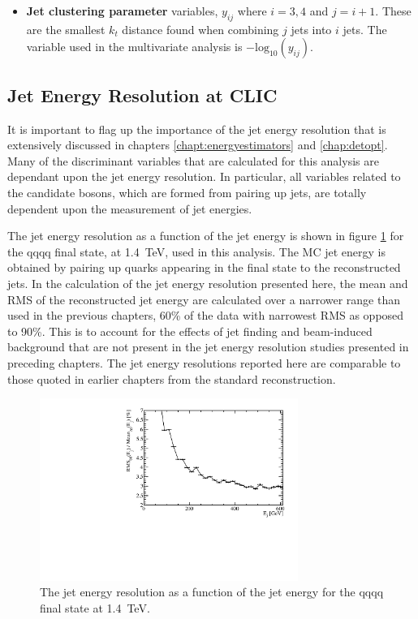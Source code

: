 \begin{itemize}
\item \textbf{Jet clustering parameter} variables, $y_{ij}$ where $i = 3,4$ and $j=i+1$.  These are the smallest $k_{t}$ distance found when combining $j$ jets into $i$ jets.  The variable used in the multivariate analysis is $-\text{log}_{10}(y_{ij})$.
\end{itemize}


\subsection{Jet Energy Resolution at CLIC} 
\label{sec:jetenergyresolution}
It is important to flag up the importance of the jet energy resolution that is extensively discussed in chapters \ref{chapt:energyestimators} and \ref{chap:detopt}.  Many of the discriminant variables that are calculated for this analysis are dependant upon the jet energy resolution.  In particular, all variables related to the candidate bosons, which are formed from pairing up jets, are totally dependent upon the measurement of jet energies.  

The jet energy resolution as a function of the jet energy is shown in figure \ref{fig:jeteenrgyresolutionphysicsanalysis} for the {\nu}{\nu}qqqq final state, at 1.4~TeV, used in this analysis.  The MC jet energy is obtained by pairing up quarks appearing in the final state to the reconstructed jets.  In the calculation of the jet energy resolution presented here, the mean and RMS of the reconstructed jet energy are calculated over a narrower range than used in the previous chapters, 60\% of the data with narrowest RMS as opposed to 90\%.  This is to account for the effects of jet finding and beam-induced background that are not present in the jet energy resolution studies presented in preceding chapters.  The jet energy resolutions reported here are comparable to those quoted in earlier chapters from the standard reconstruction.  

\begin{figure}
\centering
\includegraphics[width=0.75\textwidth]{PhysicsAnalysis/Plots/JetEnergyResolution/JetEnergyResolutionScan_1400GeV.pdf}
\caption[The jet energy resolution as a function of the jet energy for the {\nu}{\nu}qqqq final state at 1.4~TeV.]{The jet energy resolution as a function of the jet energy for the {\nu}{\nu}qqqq final state at 1.4~TeV.}
\label{fig:jeteenrgyresolutionphysicsanalysis}
\end{figure}

